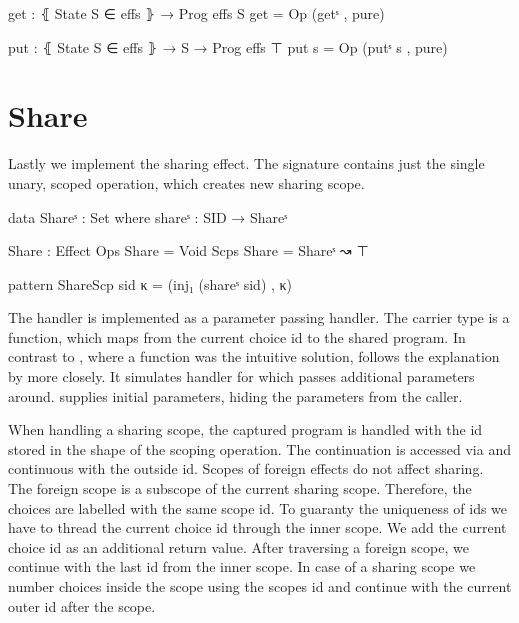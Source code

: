 \begin{code}
get : ⦃ State S ∈ effs ⦄ → Prog effs S
get = Op (getˢ , pure)

put : ⦃ State S ∈ effs ⦄ → S → Prog effs ⊤
put s = Op (putˢ s , pure)
\end{code}


\section{Share}

Lastly we implement the sharing effect.
The signature contains just the single unary, scoped operation, 
which creates new sharing scope.

\begin{code}
data Shareˢ : Set where shareˢ : SID → Shareˢ

Share : Effect
Ops   Share = Void
Scps  Share = Shareˢ ↝ ⊤

pattern ShareScp sid κ = (inj₁ (shareˢ sid) , κ)
\end{code}
The handler is implemented as a parameter passing handler.
The carrier type is a function, which maps from the current choice id to the
shared program.
In contrast to , where a function was the intuitive solution,
 follows the explanation by
\textcite{DBLP:conf/esop/PlotkinP09} more closely.
It simulates handler for  which passes additional parameters
around.
 supplies initial parameters, hiding the parameters from
the caller.

When handling a sharing scope, the captured program is handled with the id stored
in the shape of the scoping operation.
The continuation is accessed via \AgdaFunction{>>=} and continuous with the
outside id.
Scopes of foreign effects do not affect sharing.
The foreign scope is a subscope of the current sharing scope.
Therefore, the choices are labelled with the same scope id.
To guaranty the uniqueness of ids we have to thread the current choice id through
the inner scope.
We add the current choice id as an additional return value.
After traversing a foreign scope, we continue with the last id from the inner
scope.
In case of a sharing scope we number choices inside the scope using the scopes
id and continue with the current outer id after the scope.

